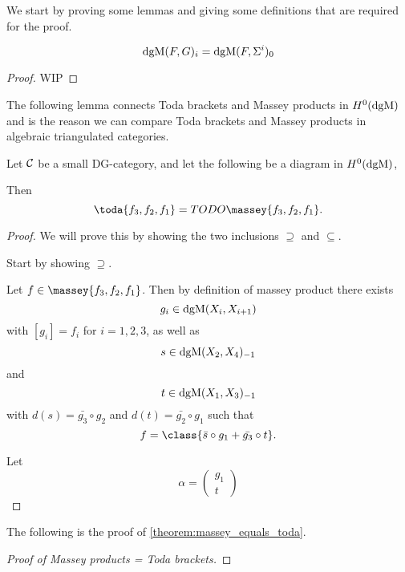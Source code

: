 We start by proving some lemmas and giving some definitions that are required for the proof.

\begin{corollary}
    \[
        \operatorname{dgM}(F, G)_i = \operatorname{dgM}(F, \Sigma^i)_0
    \]
\end{corollary}
\begin{proof}
    WIP
\end{proof}

The following lemma connects Toda brackets and Massey products in \( H^0(\operatorname{dgM}) \) and is the reason we can compare Toda brackets and Massey products in algebraic triangulated categories.

\begin{lemma}
    Let \( {\mathcal{C}} \) be a small DG-category, and let the following be a diagram in \( H^0(\operatorname{dgM}) \),
    \begin{center}
    \end{center}
    Then
    \[
        \toda{f_3, f_2, f_1} = TODO\massey{f_3, f_2, f_1}.
    \]
\end{lemma}
\begin{proof}
    We will prove this by showing the two inclusions \( \supseteq \) and \( \subseteq \).

    Start by showing \( \supseteq \).

    Let \( f \in \massey{f_3, f_2, f_1} \). Then by definition of massey product there exists
    \[
        g_i \in \operatorname{dgM}(X_i, X_{i + 1})
    \]
    with \( [g_i] = f_i \) for \( i = 1, 2, 3 \), as well as
    \[
        s \in \operatorname{dgM}(X_2, X_4)_{-1}
    \]
    and
    \[
        t \in \operatorname{dgM}(X_1, X_3)_{-1}
    \]
    with \( d(s) = \bar{g_3} \circ g_2 \) and \( d(t) = \bar{g_2} \circ g_1 \) such that
    \[
        f = \class{\bar{s} \circ g_1 + \bar{g_3} \circ t}.
    \]

    Let
    \[
        \alpha =
        \begin{pmatrix}
            g_1 \\
            t
        \end{pmatrix}
    \]
\end{proof}

The following is the proof of \autoref{theorem:massey_equals_toda}.

\begin{proof}[Proof of Massey products = Toda brackets]
    
\end{proof}